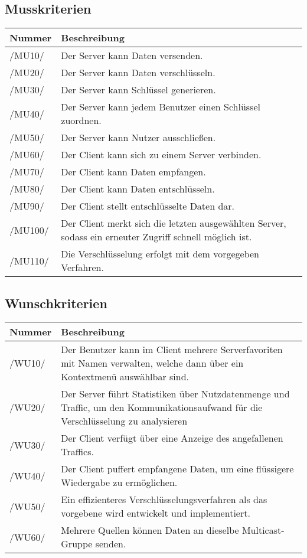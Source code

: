 \documentclass[a4paper,10pt]{article}
\newcommand\addrow[2]{#1 &#2\\ }
\newcommand\addheading[2]{#1 &#2\\ \hline}
\newcommand\tabularhead{\begin{tabular}{lp{13cm}}
\hline
}
\newenvironment{usecase}{\tabularhead}
{\hline\end{tabular}}
\begin{document}
\subsection{Musskriterien}
\newcommand{\mussKuerzel}{MU}
\begin{usecase}
\addheading{Nummer}{Beschreibung}
\addrow{/\mussKuerzel10/} {Der Server kann Daten versenden.}
\addrow{/\mussKuerzel20/} {Der Server kann Daten verschlüsseln.}
\addrow{/\mussKuerzel30/} {Der Server kann Schlüssel generieren.}
\addrow{/\mussKuerzel40/} {Der Server kann jedem Benutzer einen Schlüssel zuordnen.}
\addrow{/\mussKuerzel50/} {Der Server kann Nutzer ausschließen.}
\addrow{/\mussKuerzel60/} {Der Client kann sich zu einem Server verbinden.}
\addrow{/\mussKuerzel70/} {Der Client kann Daten empfangen.}
\addrow{/\mussKuerzel80/} {Der Client kann Daten entschlüsseln.}
\addrow{/\mussKuerzel90/} {Der Client stellt entschlüsselte Daten dar.}
\addrow{/\mussKuerzel100/} {Der Client merkt sich die letzten ausgewählten Server,
                            sodass ein erneuter Zugriff schnell möglich ist.}
\addrow{/\mussKuerzel110/} {Die Verschlüsselung erfolgt mit dem vorgegeben Verfahren.}
\end{usecase}

\subsection{Wunschkriterien}
\newcommand{\wunschKuerzel}{WU}
\begin{usecase}
\addheading{Nummer}{Beschreibung}
\addrow{/\wunschKuerzel10/} {Der Benutzer kann im Client mehrere Serverfavoriten
                             mit Namen verwalten, welche dann über ein Kontextmenü
                             auswählbar sind.}
\addrow{/\wunschKuerzel20/} {Der Server führt Statistiken über Nutzdatenmenge und Traffic,
                             um den Kommunikationsaufwand für die Verschlüsselung zu
                             analysieren}
\addrow{/\wunschKuerzel30/} {Der Client verfügt über eine Anzeige des angefallenen Traffics.}
\addrow{/\wunschKuerzel40/} {Der Client puffert empfangene Daten, um eine flüssigere
                             Wiedergabe zu ermöglichen.}
\addrow{/\wunschKuerzel50/} {Ein effizienteres Verschlüsselungsverfahren als das vorgebene
                             wird entwickelt und implementiert.}
\addrow{/\wunschKuerzel60/} {Mehrere Quellen können Daten an dieselbe Multicast-Gruppe senden.}
\end{usecase}
\end{document}
